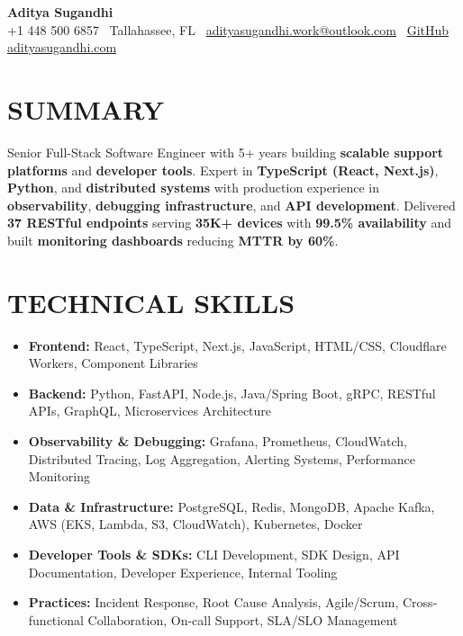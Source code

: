 \documentclass[letterpaper,10pt]{article}
\newcommand{\resumeItem}[1]{\item\small #1}
\begin{document}
\begin{center}
{\huge\textbf{Aditya Sugandhi}} \\
+1 448 500 6857 \textbar\ \textcolor{metablue}{Tallahassee, FL} \textbar\
\href{mailto:adityasugandhi.work@outlook.com}{adityasugandhi.work@outlook.com} \textbar\
\href{https://github.com/adityasugandhi}{GitHub}
\textbar \href{https://adityasugandhi.com}{adityasugandhi.com}
\end{center}
\vspace{-12pt}

\section{\textcolor{metablue}{SUMMARY}}
\small
\vspace{-6pt}
Senior Full-Stack Software Engineer with 5+ years building \textbf{scalable support platforms} and \textbf{developer tools}. Expert in \textbf{TypeScript (React, Next.js)}, \textbf{Python}, and \textbf{distributed systems} with production experience in \textbf{observability}, \textbf{debugging infrastructure}, and \textbf{API development}. Delivered \textbf{37 RESTful endpoints} serving \textbf{35K+ devices} with \textbf{99.5\% availability} and built \textbf{monitoring dashboards} reducing \textbf{MTTR by 60\%}.

\vspace{-9pt}

\section{\textcolor{metablue}{TECHNICAL SKILLS}}
\vspace{-5pt}
\small
\begin{itemize}
\resumeItem{\textbf{Frontend:} React, TypeScript, Next.js, JavaScript, HTML/CSS, Cloudflare Workers, Component Libraries}
\resumeItem{\textbf{Backend:} Python, FastAPI, Node.js, Java/Spring Boot, gRPC, RESTful APIs, GraphQL, Microservices Architecture}
\resumeItem{\textbf{Observability \& Debugging:} Grafana, Prometheus, CloudWatch, Distributed Tracing, Log Aggregation, Alerting Systems, Performance Monitoring}
\resumeItem{\textbf{Data \& Infrastructure:} PostgreSQL, Redis, MongoDB, Apache Kafka, AWS (EKS, Lambda, S3, CloudWatch), Kubernetes, Docker}
\resumeItem{\textbf{Developer Tools \& SDKs:} CLI Development, SDK Design, API Documentation, Developer Experience, Internal Tooling}
\resumeItem{\textbf{Practices:} Incident Response, Root Cause Analysis, Agile/Scrum, Cross-functional Collaboration, On-call Support, SLA/SLO Management}
\end{itemize}
\vspace{-10pt}
\end{document}
